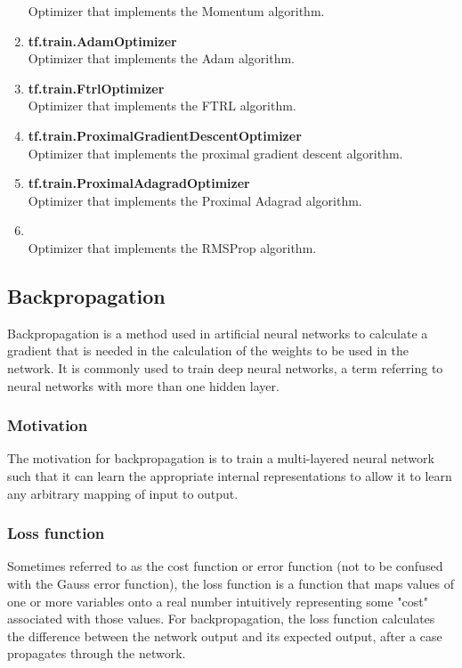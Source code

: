 \begin{enumerate}
      Optimizer that implements the Momentum algorithm.
      \item\textbf{tf.train.AdamOptimizer}\\
      Optimizer that implements the Adam algorithm.\cite{DBLP:journals/corr/KingmaB14}
      \item\textbf{tf.train.FtrlOptimizer}\\
      Optimizer that implements the FTRL algorithm.\cite{41159}
      \item\textbf{tf.train.ProximalGradientDescentOptimizer}\\
      Optimizer that implements the proximal gradient descent algorithm.\cite{NIPS2009_3793}
      \item\textbf{tf.train.ProximalAdagradOptimizer}\\
      Optimizer that implements the Proximal Adagrad algorithm.\cite{NIPS2009_3793}
      \item\textbf{ \cite{web027}}\\
      Optimizer that implements the RMSProp algorithm.\cite{web027}
      \end{enumerate}
      \subsection{Backpropagation}
      Backpropagation is a method used in artificial neural networks to calculate a gradient that is needed in the calculation of the weights to be used in the network. It is commonly used to train deep neural networks, a term referring to neural networks with more than one hidden layer.
      \subsubsection{Motivation}
      The motivation for backpropagation is to train a multi-layered neural network such that it can learn the appropriate internal representations to allow it to learn any arbitrary mapping of input to output.
      \subsubsection{Loss function}
      Sometimes referred to as the cost function or error function (not to be confused with the Gauss error function), the loss function is a function that maps values of one or more variables onto a real number intuitively representing some "cost" associated with those values. For backpropagation, the loss function calculates the difference between the network output and its expected output, after a case propagates through the network.
